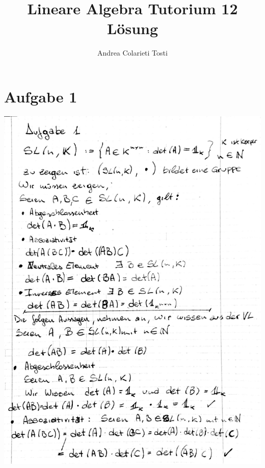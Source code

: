 \documentclass[10pt,a4paper]{article}
\author{Andrea Colarieti Tosti}
\title{Lineare Algebra Tutorium 12 Lösung}
\begin{document}
\maketitle
\newpage

\section{Aufgabe 1}
\includegraphics[scale=0.2]{la_t12_1.jpg} \\
\end{document}
